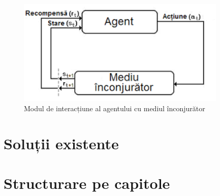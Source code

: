 \begin{figure}[h]
	\center
	\includegraphics[width=10cm, keepaspectratio]{fig/reinforcement_learning_feedback_loop.png}
	\caption{Modul de interacțiune al agentului cu mediul înconjurător}
\end{figure}


\section{Soluții existente}

\section{Structurare pe capitole}